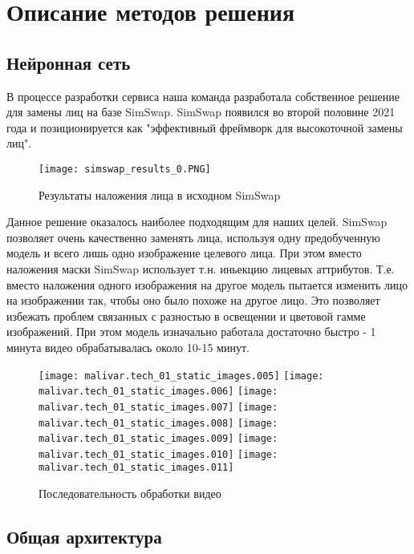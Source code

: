 
\section{Описание методов решения}

\subsection{Нейронная сеть}

В процессе разработки сервиса наша команда разработала собственное решение для замены лиц на базе SimSwap\cite{DBLP:conf/mm/ChenCNG20}. SimSwap\cite{DBLP:conf/mm/ChenCNG20} появился во второй половине 2021 года и позиционируется как "эффективный фреймворк для высокоточной замены лиц".

\begin{figure}[H]
	\centering
	\texttt{[image: simswap\_results\_0.PNG]}
	\caption{Результаты наложения лица в исходном SimSwap} \label{simswap_results}
\end{figure}

Данное решение оказалось наиболее подходящим для наших целей. SimSwap позволяет очень качественно заменять лица, используя одну предобученную модель и всего лишь одно изображение целевого лица. При этом вместо наложения маски SimSwap использует т.н. иньекцию лицевых аттрибутов. Т.е. вместо наложения одного изображения на другое модель пытается изменить лицо на изображении так, чтобы оно было похоже на другое лицо. Это позволяет избежать проблем связанных с разностью в освещении и цветовой гамме изображений. При этом модель изначально работала достаточно быстро - 1 минута видео обрабатывалась около 10-15 минут.

\noindent

\begin{figure}
	\texttt{[image: malivar.tech\_01\_static\_images.005]}
	\texttt{[image: malivar.tech\_01\_static\_images.006]}
	\texttt{[image: malivar.tech\_01\_static\_images.007]}
	\texttt{[image: malivar.tech\_01\_static\_images.008]}
	\texttt{[image: malivar.tech\_01\_static\_images.009]}
	\texttt{[image: malivar.tech\_01\_static\_images.010]}
	\texttt{[image: malivar.tech\_01\_static\_images.011]}
	\caption{Последовательность обработки видео}
\end{figure}

\subsection{Общая архитектура}

